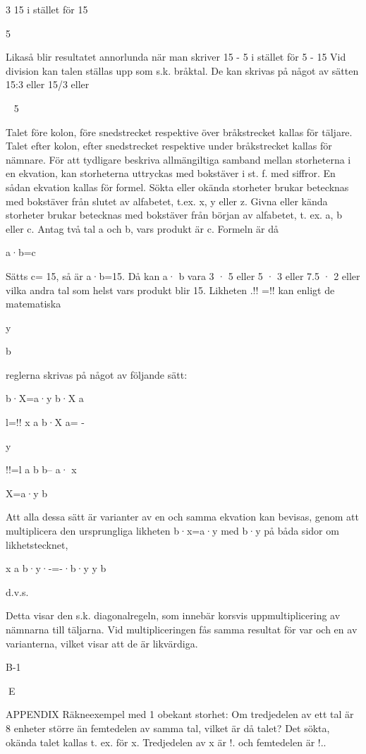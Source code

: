 \documentclass[a4paper,twoside,twocolumn,openright]{book}
\begin{document}
{{{{3
15
i stället för
15

5

Likaså blir resultatet annorlunda när man
skriver 15 - 5 i stället för 5 - 15
Vid division kan talen ställas upp som s.k.
bråktal. De kan skrivas på något av sätten
15:3 eller 15/3 eller

~
5

Talet före kolon, före snedstrecket respektive över bråkstrecket kallas för täljare.
Talet efter kolon, efter snedstrecket respektive under bråkstrecket kallas för nämnare.
För att tydligare beskriva allmängiltiga samband mellan storheterna i en ekvation, kan
storheterna uttryckas med bokstäver i st. f.
med siffror. En sådan ekvation kallas för
formel.
Sökta eller okända storheter brukar betecknas med bokstäver från slutet av alfabetet, t.ex. x, y eller z. Givna eller kända
storheter brukar betecknas med bokstäver
från början av alfabetet, t. ex. a, b eller c.
Antag två tal a och b, vars produkt är c.
Formeln är då

a·b=c

Sätts c= 15, så är a·b=15. Då kan a· b
vara 3 · 5 eller 5 · 3 eller 7.5 · 2 eller vilka
andra tal som helst vars produkt blir 15.
Likheten .!! =!! kan enligt de matematiska

y

b

reglerna skrivas på något av följande sätt:

b·X=a·y
b·X
a

l=!!
x a
b·X
a=
-

y

!!=l
a b
b-- a·
x

X=a·y
b

Att alla dessa sätt är varianter av en och
samma ekvation kan bevisas, genom att
multiplicera den ursprungliga likheten
b·x=a·y med b·y på båda sidor om
likhetstecknet,

x a
b·y·-=-·b·y
y b

d.v.s.

Detta visar den s.k. diagonalregeln, som
innebär korsvis uppmultiplicering av nämnarna till täljarna.
Vid multipliceringen fås samma resultat
för var och en av varianterna, vilket visar att
de är likvärdiga.

B-1

E

APPENDIX
Räkneexempel med 1 obekant storhet:
Om tredjedelen av ett tal är 8 enheter större
än femtedelen av samma tal, vilket är då
talet?
Det sökta, okända talet kallas t. ex. för x.
Tredjedelen av x är !. och femtedelen är !..

}}}}
\end{document}
